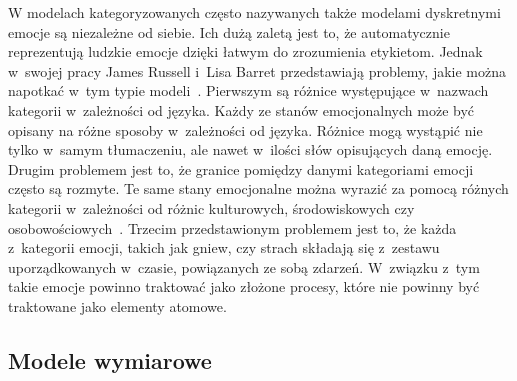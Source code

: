 W modelach kategoryzowanych często nazywanych także modelami dyskretnymi emocje są niezależne od siebie. Ich dużą zaletą jest to, że automatycznie reprezentują ludzkie emocje dzięki łatwym do zrozumienia etykietom. Jednak w~swojej pracy James Russell i~Lisa Barret przedstawiają problemy, jakie można napotkać w~tym typie modeli~\cite{russel_barret_core_affect}. Pierwszym są różnice występujące w~nazwach kategorii w~zależności od języka. Każdy ze stanów emocjonalnych może być opisany na różne sposoby w~zależności od języka. Różnice mogą wystąpić nie tylko w~samym tłumaczeniu, ale nawet w~ilości słów opisujących daną emocję. Drugim problemem jest to, że granice pomiędzy danymi kategoriami emocji często są rozmyte. Te same stany emocjonalne można wyrazić za pomocą różnych kategorii w~zależności od różnic kulturowych, środowiskowych czy osobowościowych~\cite{emotion_models_review_2017}. Trzecim przedstawionym problemem jest to, że każda z~kategorii emocji, takich jak gniew, czy strach składają się z~zestawu uporządkowanych w~czasie, powiązanych ze sobą zdarzeń. W~związku z~tym takie emocje powinno traktować jako złożone procesy, które nie powinny być traktowane jako elementy atomowe.

\subsection{Modele wymiarowe}

